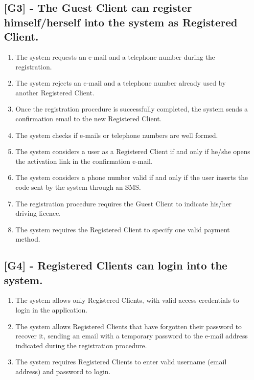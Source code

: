 \subsection{[G3] - The Guest Client can register himself/herself into the system as Registered Client.}
\begin{enumerate}[label=R3.\arabic*]
\item The system requests an e-mail and a telephone number during the registration.
\item The system rejects an e-mail and a telephone number already used by another Registered Client.
\item Once the registration procedure is successfully completed, the system sends a confirmation email to the new Registered Client.
\item The system checks if e-mails or telephone numbers are well formed.
\item The system considers a user as a Registered Client if and only if he/she opens the activation link in the confirmation e-mail.
\item The system considers a phone number valid if and only if the user inserts the code sent by the system through an SMS.
\item The registration procedure requires the Guest Client to indicate his/her driving licence.
\item The system requires the Registered Client to specify one valid payment method.
\end{enumerate}





\subsection{[G4] - Registered Clients can login into the system.}
\begin{enumerate}[label=R4.\arabic*]
\item The system allows only Registered Clients, with valid access credentials to login in the application.
\item The system allows Registered Clients that have forgotten their password to recover it, sending an email with a temporary password to the e-mail address indicated during the registration procedure.
\item The system requires Registered Clients to enter valid username (email address) and password to login.
\end{enumerate}


